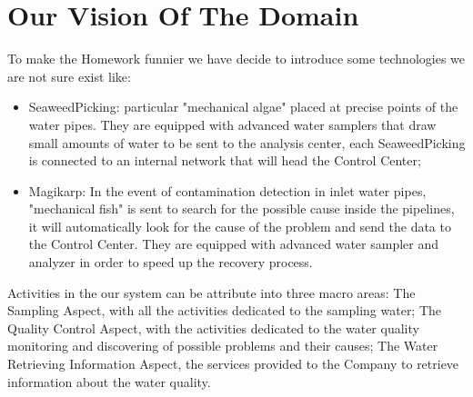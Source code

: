 \chapter{Our Vision Of The Domain}
To make the Homework funnier we have decide to introduce some technologies we are not sure exist like:
\begin{itemize}
\item SeaweedPicking: particular "mechanical algae" placed at precise points of the water pipes. 		They are equipped with advanced water samplers that draw small amounts of water to be sent to the analysis center, each SeaweedPicking is connected to an internal network that will head the Control Center;
\item Magikarp: In the event of contamination detection in inlet water pipes, "mechanical fish" is sent to search for the possible cause inside the pipelines, it will automatically look for the cause of the problem and send the data to the Control Center. They are equipped with advanced water sampler and analyzer in order to speed up the recovery process.
\end{itemize}
Activities in the our system can be attribute into three macro areas:
The Sampling Aspect, with all the activities dedicated to the sampling water;
The Quality Control Aspect, with the activities dedicated to the water quality monitoring and discovering of possible problems and their causes;
The Water Retrieving Information Aspect, the services provided to the Company to retrieve information about the water quality.
